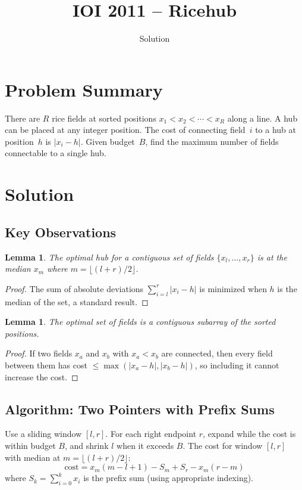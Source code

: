 \documentclass[11pt,a4paper]{article}
\title{IOI 2011 -- Ricehub}
\author{Solution}
\date{}
\newtheorem{lemma}[theorem]{Lemma}
\begin{document}
\maketitle

\section{Problem Summary}
There are $R$ rice fields at sorted positions $x_1 < x_2 < \cdots < x_R$ along a line. A hub can be placed at any integer position. The cost of connecting field~$i$ to a hub at position~$h$ is $|x_i - h|$. Given budget~$B$, find the maximum number of fields connectable to a single hub.

\section{Solution}

\subsection{Key Observations}

\begin{lemma}
The optimal hub for a contiguous set of fields $\{x_l, \ldots, x_r\}$ is at the median $x_m$ where $m = \lfloor(l+r)/2\rfloor$.
\end{lemma}
\begin{proof}
The sum of absolute deviations $\sum_{i=l}^{r} |x_i - h|$ is minimized when $h$ is the median of the set, a standard result.
\end{proof}

\begin{lemma}
The optimal set of fields is a contiguous subarray of the sorted positions.
\end{lemma}
\begin{proof}
If two fields $x_a$ and $x_b$ with $x_a < x_b$ are connected, then every field between them has cost $\le \max(|x_a - h|, |x_b - h|)$, so including it cannot increase the cost.
\end{proof}

\subsection{Algorithm: Two Pointers with Prefix Sums}
Use a sliding window $[l, r]$. For each right endpoint $r$, expand while the cost is within budget $B$, and shrink $l$ when it exceeds $B$. The cost for window $[l, r]$ with median at $m = \lfloor(l+r)/2\rfloor$:
\[
\text{cost} = x_m(m - l + 1) - S_m + S_r - x_m(r - m)
\]
where $S_k = \sum_{i=0}^{k} x_i$ is the prefix sum (using appropriate indexing).
\end{document}
